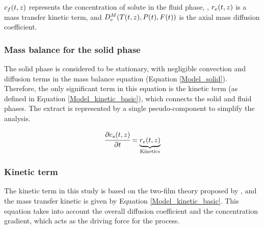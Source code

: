 \documentclass[../Article_Model_Parameters.tex]{subfiles}
\begin{document}
	${\color{black}c_f}(t,z)$ represents the concentration of solute in the fluid phase, , ${\color{black}r_e}(t,z)$ is a mass transfer kinetic term, and ${\color{black}D^M_e}({\color{black}T}(t,z),{\color{black}P}(t),{\color{black}F}(t))$ is the axial mass diffusion coefficient.
	
	\subsubsection{Mass balance for the solid phase} \label{Mass_balance_solid}
	
	The solid phase is considered to be stationary, with negligible convection and diffusion terms in the mass balance equation (Equation \ref{Model_solid}). Therefore, the only significant term in this equation is the kinetic term (as defined in Equation \ref{Model_kinetic_basic}), which connects the solid and fluid phases. The extract is represented by a single pseudo-component to simplify the analysis. 
	
	{\footnotesize
		\begin{equation} 
			\label{Model_solid}
					\cfrac{\partial {\color{black}c_s}(t,z)}{\partial t} = \underbrace{ {\color{black}r_e}(t,z) }_{\text{Kinetics}}
			\end{equation} }
			
	\subsubsection{Kinetic term} \label{CH: Kinetic}
	
	
	The kinetic term in this study is based on the two-film theory proposed by \citet{Reverchon1996}, and the mass transfer kinetic is given by Equation \ref{Model_kinetic_basic}. This equation takes into account the overall diffusion coefficient and the concentration gradient, which acts as the driving force for the process.
	
\end{document}
